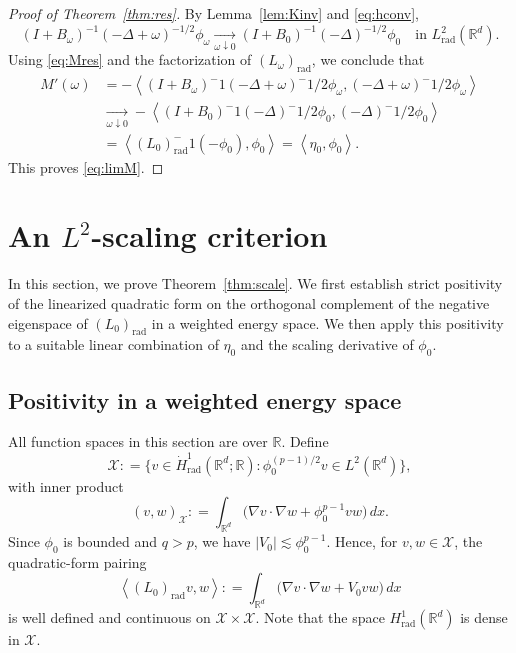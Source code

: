 \documentclass[12pt, a4paper, reqno]{amsart}
\numberwithin{equation}{section}
\theoremstyle{definition}
\theoremstyle{remark}
\newcommand{\R}{\mathbb R}
\newcommand{\scX}{\mathscr X}
\def\tbra[#1,#2]{{\left\langle #1,#2\right\rangle}}
\def\norm[#1]{{\left\Vert #1 \right\Vert}}
\newcommand{\rad}{\mathrm{rad}}
\newcommand{\ce}{\mathrel{\mathop:}=}
\begin{document}
\begin{proof}[Proof of Theorem~\ref{thm:res}]
By Lemma~\ref{lem:Kinv} and
\eqref{eq:hconv},
\[
  (I+B_\omega)^{-1}(-\Delta+\omega)^{-1/2}\phi_\omega
  \xrightarrow[\omega\downarrow0]{}
  (I+B_0)^{-1}(-\Delta)^{-1/2}\phi_0
  \quad\text{in }L^2_{\rad}(\R^d).
\]
Using \eqref{eq:Mres} and the factorization of $(L_\omega)_{\rad}$,
we conclude that
\begin{align*}
  M'(\omega)
  &=-\tbra[
    (I+B_\omega)^{-1}(-\Delta+\omega)^{-1/2}\phi_\omega,
    (-\Delta+\omega)^{-1/2}\phi_\omega
  ]
  \\
  &\xrightarrow[\omega\downarrow0]{}
  -\tbra[
    (I+B_0)^{-1}(-\Delta)^{-1/2}\phi_0,
    (-\Delta)^{-1/2}\phi_0
  ]
  \\
  &=\tbra[(L_0)_{\rad}^{-1}(-\phi_0),\phi_0]
  =\tbra[\eta_0,\phi_0].
\end{align*}
This proves \eqref{eq:limM}.
\end{proof}


\section{\texorpdfstring{An $L^2$-scaling criterion}{An L2-scaling criterion}}
\label{sec:scale}

In this section, we prove Theorem~\ref{thm:scale}. 
We first establish strict positivity of the linearized quadratic form
on the orthogonal complement of the negative eigenspace of
$(L_0)_{\rad}$ in a weighted energy space. 
We then apply this positivity to a suitable
linear combination of $\eta_0$ and the scaling derivative of $\phi_0$.


\subsection{Positivity in a weighted energy space}

All function spaces in this section are over $\R$. Define
\[
  \scX
  \ce\bigl\{
    v\in\dot H^1_{\rad}(\R^d;\R):
    \phi_0^{(p-1)/2}v\in L^2(\R^d)
  \bigr\},
\]
with inner product
\[
  (v,w)_\scX
  \ce\int_{\R^d}
    \bigl(\nabla v\cdot\nabla w+\phi_0^{p-1}vw\bigr)\,dx.
\]
Since $\phi_0$ is bounded and $q>p$, we have
$|V_0|\lesssim\phi_0^{p-1}$. Hence, for $v,w\in \scX$, the quadratic-form
pairing
\[
  \tbra[(L_0)_{\rad}v,w]
  \ce\int_{\R^d}
    \bigl(\nabla v\cdot\nabla w+V_0vw\bigr)\,dx
\]
is well defined and continuous on $\scX\times \scX$. Note that the space $H^1_{\rad}(\R^d)$ is dense in $\scX$. 
\end{document}
